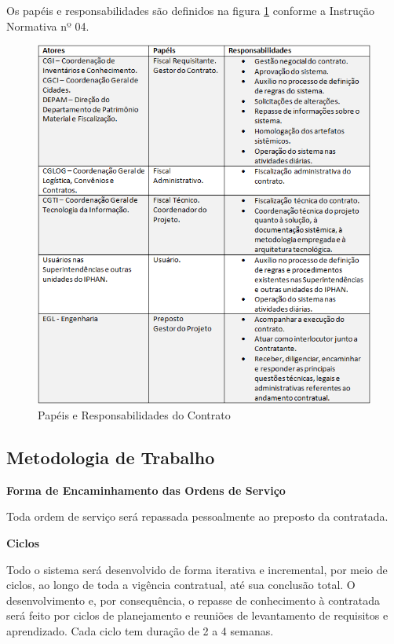 Os papéis e responsabilidades são definidos na figura \ref{papeis} conforme a Instrução Normativa nº 04.

\begin{figure}[H]
		\centering
			\includegraphics[scale=1.0]{figuras/papeis.png}
		\caption{Papéis e Responsabilidades do Contrato}
		\label{papeis}
\end{figure}


\subsection[Metodologia de Trabalho]{Metodologia de Trabalho}

\textbf{Forma de Encaminhamento das Ordens de Serviço}

Toda ordem de serviço será repassada pessoalmente ao preposto da contratada.


\textbf{Ciclos}

Todo o sistema será desenvolvido de forma iterativa e incremental, por meio de ciclos, ao longo de toda a vigência contratual, até sua conclusão total. O desenvolvimento e, por consequência, o repasse de conhecimento à contratada será feito por ciclos de planejamento e reuniões de levantamento de requisitos e aprendizado. Cada ciclo tem duração de 2 a 4 semanas.

